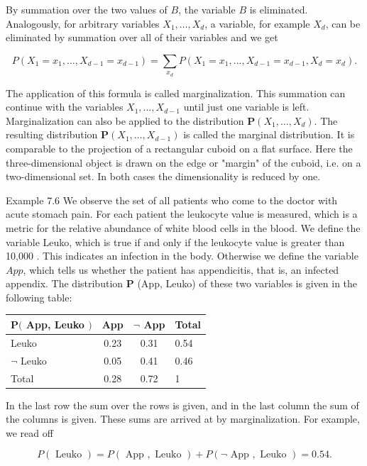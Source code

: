 \documentclass[10pt]{article}
\begin{document}
By summation over the two values of $B$, the variable $B$ is eliminated. Analogously, for arbitrary variables $X_{1}, \ldots, X_{d}$, a variable, for example $X_{d}$, can be eliminated by summation over all of their variables and we get

$$
P\left(X_{1}=x_{1}, \ldots, X_{d-1}=x_{d-1}\right)=\sum_{x_{d}} P\left(X_{1}=x_{1}, \ldots, X_{d-1}=x_{d-1}, X_{d}=x_{d}\right) .
$$

The application of this formula is called marginalization. This summation can continue with the variables $X_{1}, \ldots, X_{d-1}$ until just one variable is left. Marginalization can also be applied to the distribution $\boldsymbol{P}\left(X_{1}, \ldots, X_{d}\right)$. The resulting distribution $\boldsymbol{P}\left(X_{1}, \ldots, X_{d-1}\right)$ is called the marginal distribution. It is comparable to the projection of a rectangular cuboid on a flat surface. Here the three-dimensional object is drawn on the edge or "margin" of the cuboid, i.e. on a two-dimensional set. In both cases the dimensionality is reduced by one.

Example 7.6 We observe the set of all patients who come to the doctor with acute stomach pain. For each patient the leukocyte value is measured, which is a metric for the relative abundance of white blood cells in the blood. We define the variable Leuko, which is true if and only if the leukocyte value is greater than 10,000 . This indicates an infection in the body. Otherwise we define the variable $A p p$, which tells us whether the patient has appendicitis, that is, an infected appendix. The distribution $\boldsymbol{P}$ (App, Leuko) of these two variables is given in the following table:

\begin{center}
\begin{tabular}{lccl}
\hline
$\boldsymbol{P}($ App, Leuko $)$ & App & $\neg$ App & Total \\
\hline
Leuko & 0.23 & 0.31 & 0.54 \\
\hline
$\neg$ Leuko & 0.05 & 0.41 & 0.46 \\
\hline
Total & 0.28 & 0.72 & 1 \\
\hline
\end{tabular}
\end{center}

In the last row the sum over the rows is given, and in the last column the sum of the columns is given. These sums are arrived at by marginalization. For example, we read off

$$
P(\text { Leuko })=P(\text { App }, \text { Leuko })+P(\neg \text { App }, \text { Leuko })=0.54 .
$$
\end{document}
